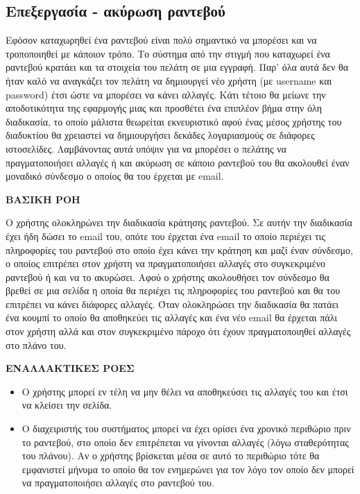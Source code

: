 \subsection{Επεξεργασία - ακύρωση ραντεβού}
Εφόσον καταχωρηθεί ένα ραντεβού είναι πολύ σημαντικό να μπορέσει και να τροποποιηθεί με κάποιον τρόπο. Το σύστημα από την στιγμή που καταχωρεί ένα ραντεβού κρατάει και τα στοιχεία του πελάτη σε μια εγγραφή. Παρ' όλα αυτά δεν θα ήταν καλό να αναγκάζει τον πελάτη να δημιουργεί νέο χρήστη (με username και password) έτσι ώστε να μπορέσει να κάνει αλλαγές. Κάτι τέτοιο θα μείωνε την αποδοτικότητα της εφαρμογής μιας και προσθέτει ένα επιπλέον βήμα στην όλη διαδικασία, το οποίο μάλιστα θεωρείται εκνευριστικό αφού ένας μέσος χρήστης του διαδυκτίου θα χρειαστεί να δημιουργήσει δεκάδες λογαριασμούς σε διάφορες ιστοσελίδες. Λαμβάνοντας αυτά υπόψιν για να μπορέσει ο πελάτης να πραγματοποιήσει αλλαγές ή και ακύρωση σε κάποιο ραντεβού του θα ακολουθεί έναν μοναδικό σύνδεσμο ο οποίος θα του έρχεται με email.

\textbf{ΒΑΣΙΚΗ ΡΟΗ}

Ο χρήστης ολοκληρώνει την διαδικασία κράτησης ραντεβού. Σε αυτήν την διαδικασία έχει ήδη δώσει το email του, οπότε του έρχεται ένα email το οποίο περιέχει τις πληροφορίες του ραντεβού στο οποίο έχει κάνει την κράτηση και μαζί έναν σύνδεσμο, ο οποίος επιτρέπει στον χρήστη να πραγματοποιήσει αλλαγές στο συγκεκριμένο ραντεβού ή και να το ακυρώσει. Αφού ο χρήστης ακολουθήσει τον σύνδεσμο θα βρεθεί σε μια σελίδα η οποία θα περιέχει τις πληροφορίες του ραντεβού και θα του επιτρέπει να κάνει διάφορες αλλαγές. Όταν ολοκληρώσει την διαδικασία θα πατάει ένα κουμπί το οποίο θα αποθηκεύει τις αλλαγές και ένα νέο email θα έρχεται πάλι στον χρήστη αλλά και στον συγκεκριμένο πάροχο ότι έχουν πραγματοποιηθεί αλλαγές στο πλάνο του.

\textbf{ΕΝΑΛΛΑΚΤΙΚΕΣ ΡΟΕΣ}

\begin{itemize}
\item Ο χρήστης μπορεί εν τέλη να μην θέλει να αποθηκεύσει τις αλλαγές του και έτσι να κλείσει την σελίδα.
\item Ο διαχειριστής του συστήματος μπορεί να έχει ορίσει ένα χρονικό περιθώριο πριν το ραντεβού, στο οποίο δεν επιτρέπεται να γίνονται αλλαγές (λόγω σταθερότητας του πλάνου). Αν ο χρήστης βρίσκεται μέσα σε αυτό το περιθώριο τότε θα εμφανιστεί μήνυμα το οποίο θα τον ενημερώνει για τον λόγο τον οποίο δεν μπορεί να πραγματοποιήσει αλλαγές στο ραντεβού του. 
\end{itemize}

